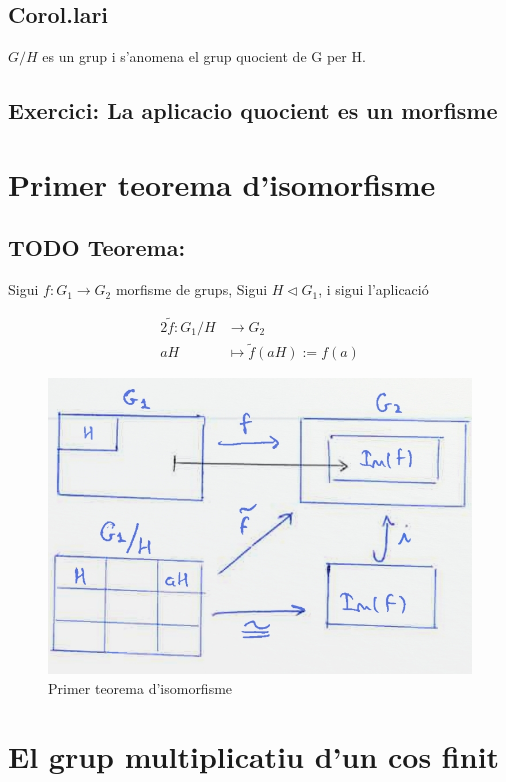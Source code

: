 \documentclass[11pt]{article}
\begin{document}
\subsection{Corol.lari}
\label{sec:org2e043cb}
\(G/H\) es un grup i s'anomena el grup quocient de G per H.
\subsection{Exercici: La aplicacio quocient es un morfisme}
\label{sec:org184de6a}

\section{Primer teorema d'isomorfisme}
\label{sec:org49da3d5}

\subsection{{\bfseries\sffamily TODO} Teorema:}
\label{sec:org07c0ff9}
Sigui \(f: G_1 \to G_2\) morfisme de grups, Sigui \(H \vartriangleleft G_1\), i sigui l'aplicació

\begin{alignat*}{2}
\tilde{f}: G_1/H &\to G_2 \\
aH &\mapsto \tilde{f}(aH) := f(a)
\end{alignat*}
\begin{figure}[htbp]
\centering
\includegraphics[width=.9\linewidth]{./images/primeriso.jpg}
\caption{\label{fig:orgc3f0ad9}
Primer teorema d'isomorfisme}
\end{figure}

\section{El grup multiplicatiu d'un cos finit}
\label{sec:org681cd85}
\end{document}
